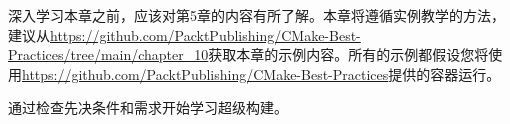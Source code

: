 深入学习本章之前，应该对第5章的内容有所了解。本章将遵循实例教学的方法，建议从\url{https://github.com/PacktPublishing/CMake-Best-Practices/tree/main/chapter_10}获取本章的示例内容。所有的示例都假设您将使用\url{https://github.com/PacktPublishing/CMake-Best-Practices}提供的容器运行。

通过检查先决条件和需求开始学习超级构建。